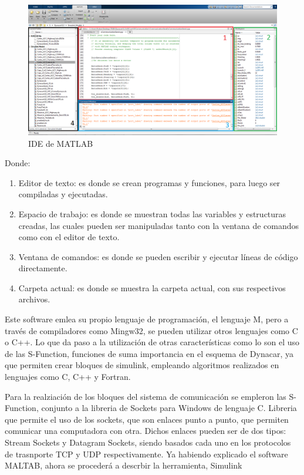 \begin{figure}[!h]
	\centering
		\includegraphics[scale=0.3]{Imagenes/ide}
		\caption{IDE de MATLAB}
		\label{fig:ide}
\end{figure}	 
\par Donde:\\
\begin{enumerate}
    \item Editor de texto: es donde se crean programas y funciones, para luego ser compiladas y ejecutadas. 
    \item Espacio de trabajo: es donde se muestran todas las variables y estructuras creadas, las cuales pueden ser manipuladas tanto con la ventana de comandos como con el editor de texto.
    \item Ventana de comandos: es donde se pueden escribir y ejecutar líneas de código directamente.
    \item Carpeta actual: es donde se muestra la carpeta actual, con sus respectivos archivos.
\end{enumerate}
\par Este software emlea su propio lenguaje de programación, el lenguaje M, pero a través de compiladores como Mingw32, se pueden utilizar otros lenguajes como C o C++. Lo que da paso a la utilización de otras características como lo son el uso de las S-Function, funciones de suma importancia en el esquema de Dynacar, ya que permiten crear bloques de simulink, empleando algoritmos realizados en lenguajes como C, C++ y Fortran.\\
\par Para la realziación de los bloques del sistema de comunicación se empleron las S-Function, conjunto a la libreria de Sockets para Windows de lenguaje C. Libreria que permite el uso de los sockets, que son enlaces punto a punto, que permiten comunicar una computadora con otra. Dichos enlaces pueden ser de dos tipos: Stream Sockets y Datagram Sockets, siendo basados cada uno en los protocolos de trasnporte TCP y UDP respectivamente. Ya habiendo explicado el software MALTAB, ahora se procederá a descrbir la herramienta, Simulink
